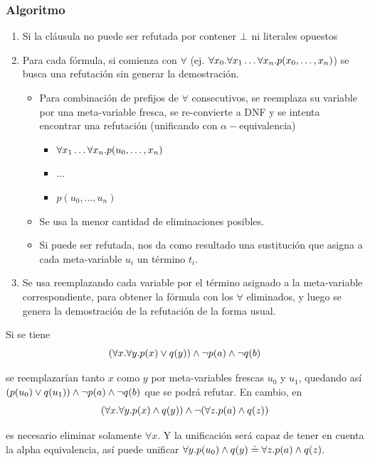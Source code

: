 \subsubsection{Algoritmo}
\begin{enumerate}
    \item Si la cláusula no puede ser refutada por contener $\bot$ ni literales opuestos
    \item Para cada fórmula, si comienza con $\forall$ (ej. $\forall x_0 . \forall x_1 \dots \forall x_n . p(x_0, \dots, x_n)$) se busca una refutación sin generar la demostración.
    \begin{itemize}
        \item Para combinación de prefijos de $\forall$ consecutivos, se
        reemplaza su variable por una meta-variable fresca, se re-convierte a
        DNF y se intenta encontrar una refutación (unificando con $\alpha-$equivalencia)
        \begin{itemize}
            \item $\forall x_1 \dots \forall x_n . p(u_0, \dots, x_n)$
            \item $\dotso$
            \item $p(u_0, \dots, u_n)$
        \end{itemize}
        \item Se usa la menor cantidad de eliminaciones posibles.
        \item Si puede ser refutada, nos da como resultado una sustitución que asigna a cada meta-variable $u_i$ un término $t_i$.
    \end{itemize}
    \item Se usa  reemplazando cada variable por el término asignado a la meta-variable correspondiente, para obtener la fórmula con los $\forall$ eliminados, y luego se genera la demostración de la refutación de la forma usual.
\end{enumerate}

\begin{ejemplo}
Si se tiene
\[
    (\forall x. \forall y . p(x) \vee q(y)) \wedge \neg p(a) \wedge \neg q(b)
\]

se reemplazarían tanto $x$ como $y$ por meta-variables frescas $u_0$ y $u_1$, quedando así $(p(u_0) \vee q(u_1)) \wedge \neg p(a) \wedge \neg q(b)$ que se podrá refutar. En cambio, en
\[
    (\forall x. \forall y . p(x) \wedge q(y)) \wedge \neg (\forall z. p(a) \wedge q(z))
\]

es necesario eliminar solamente $\forall x$. Y la unificación será capaz de tener en cuenta la alpha equivalencia, así puede unificar $\forall y . p(u_0) \wedge q(y) \doteq \forall z. p(a) \wedge q(z)$.
\end{ejemplo}

